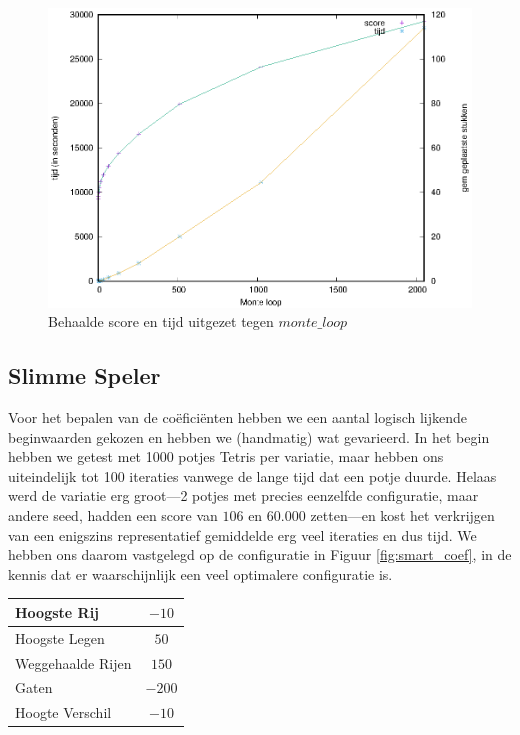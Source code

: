 \documentclass[10pt]{article}
\begin{document}
\begin{figure}
\begin{center}
\includegraphics{carlo.eps}
\caption{Behaalde score en tijd uitgezet tegen $monte\_loop$}\label{fig:monte_score}

\end{center}
\end{figure}



\subsection{Slimme Speler}
\begin{minipage}{0.65\textwidth}
Voor het bepalen van de co\"efici\"enten hebben we een aantal logisch lijkende beginwaarden gekozen en hebben we (handmatig) wat gevarieerd. In het begin hebben we getest met 1000 potjes Tetris per variatie, maar hebben ons uiteindelijk tot 100 iteraties vanwege de lange tijd dat een potje duurde. Helaas werd de variatie erg groot---2 potjes met precies eenzelfde configuratie, maar andere seed, hadden een score van $106$ en $60.000$ zetten---en kost het verkrijgen van een enigszins representatief gemiddelde erg veel iteraties en dus tijd. We hebben ons daarom vastgelegd op de configuratie in Figuur \ref{fig:smart_coef}, in de kennis dat er waarschijnlijk een veel optimalere configuratie is.
\end{minipage}
\hspace{0.5cm}
%
\begin{minipage}{0.25\textwidth}
\begin{tabular}{l|c}
	Hoogste Rij		& $-10$ \\ \hline
	Hoogste Legen		& $50$ \\ \hline
	Weggehaalde Rijen	& $150$ \\ \hline
	Gaten			& $-200$ \\ \hline
	Hoogte Verschil		& $-10$ \\
\end{tabular}
\label{fig:smart_coef}
\end{minipage}
\end{document}

